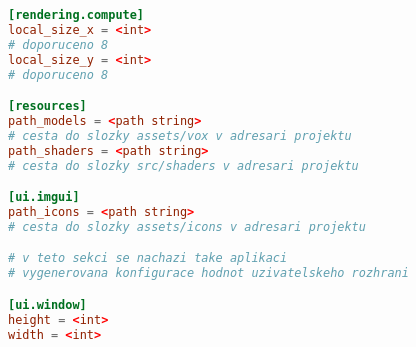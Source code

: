 \begin{lstlisting}[language=toml]
[rendering.compute]
local_size_x = <int> 
# doporuceno 8
local_size_y = <int> 
# doporuceno 8

[resources]
path_models = <path string> 
# cesta do slozky assets/vox v adresari projektu
path_shaders = <path string> 
# cesta do slozky src/shaders v adresari projektu

[ui.imgui]
path_icons = <path string> 
# cesta do slozky assets/icons v adresari projektu

# v teto sekci se nachazi take aplikaci
# vygenerovana konfigurace hodnot uzivatelskeho rozhrani

[ui.window]
height = <int>
width = <int>

\end{lstlisting}